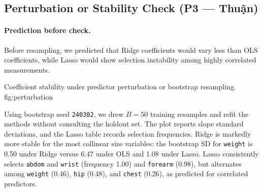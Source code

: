 \subsection{Perturbation or Stability Check (P3 — Thuận)}
\label{sec:perturbation}

\paragraph{Prediction before check.}
Before resampling, we predicted that Ridge coefficients would vary less than
OLS coefficients, while Lasso would show selection instability among highly
correlated measurements.

%
    {Coefficient stability under predictor perturbation or bootstrap resampling.}%
    {fig:perturbation}

Using bootstrap seed \texttt{240302}, we drew $B=50$ training resamples and
refit the methods without consulting the holdout set.  The plot reports slope
standard deviations, and the Lasso table records selection frequencies.
Ridge is markedly more stable for the most collinear size variables: the
bootstrap SD for \texttt{weight} is 0.50 under Ridge versus 6.47 under OLS and
1.08 under Lasso.  Lasso consistently selects \texttt{abdom} and \texttt{wrist}
(frequency 1.00) and \texttt{forearm} (0.98), but alternates among
\texttt{weight} (0.46), \texttt{hip} (0.48), and \texttt{chest} (0.26), as
predicted for correlated predictors.

